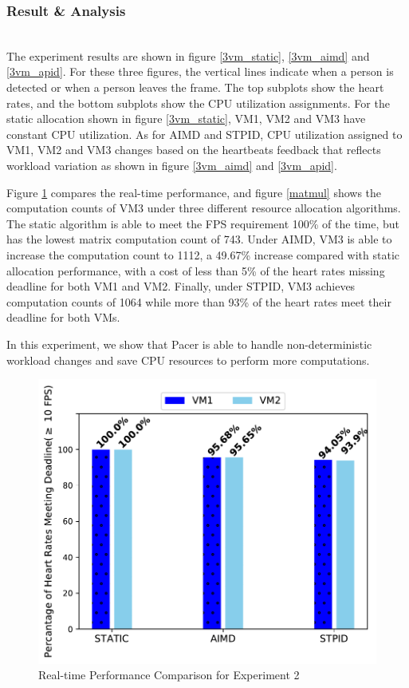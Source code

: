 \subsubsection*{Result \& Analysis}\hfill\\
\indent The experiment results are shown in figure \ref{3vm_static}, \ref{3vm_aimd} and \ref{3vm_apid}. For these three figures, the vertical lines indicate when a person is detected or when a person leaves the frame. The top subplots show the heart rates, and the bottom subplots show the CPU utilization assignments. For the static allocation shown in figure \ref{3vm_static}, VM1, VM2 and VM3 have constant CPU utilization. As for AIMD and STPID, CPU utilization assigned to VM1, VM2 and VM3 changes based on the heartbeats feedback that reflects workload variation as shown in figure \ref{3vm_aimd} and \ref{3vm_apid}.

Figure \ref{3vm_fps} compares the real-time performance, and figure \ref{matmul} shows the computation counts of VM3 under three different resource allocation algorithms. The static algorithm is able to meet the FPS requirement 100\% of the time, but has the lowest matrix computation count of 743. Under AIMD, VM3 is able to increase the computation count to 1112, a 49.67\% increase compared with static allocation performance, with a cost of less than 5\% of the heart rates missing deadline for both VM1 and VM2. Finally, under STPID, VM3 achieves computation counts of 1064 while more than 93\% of the heart rates meet their deadline for both VMs.

In this experiment, we show that Pacer is able to handle non-deterministic workload changes and save CPU resources to perform more computations.



\begin{figure}[h!]
\centering
\includegraphics[width=.9\linewidth]{images/3vm_fps}
\caption{Real-time Performance Comparison for Experiment 2}
\label{3vm_fps}
\end{figure}


